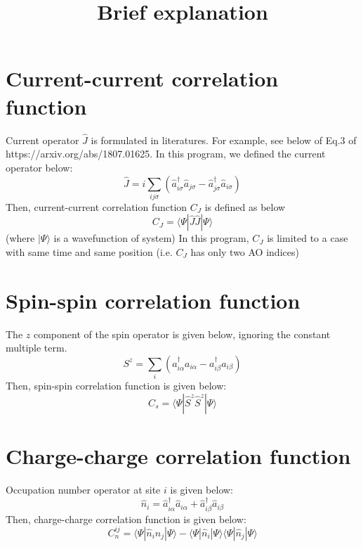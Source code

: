 \documentclass{article}
\begin{document}
\title{Brief explanation}
\maketitle


\section{Current-current correlation function}
Current operator $\hat{J}$ is formulated in literatures. 
For example, see below of Eq.3 of https://arxiv.org/abs/1807.01625.
In this program, we defined the current operator below:
\begin{equation}
    \hat{J} = i\sum_{ij\sigma} (\hat{a}^{\dagger}_{i\sigma}\hat{a}_{j\sigma} - \hat{a}^{\dagger}_{j\sigma}\hat{a}_{i\sigma})
\end{equation}
Then, current-current correlation function $C_{J}$ is defined as below
\begin{equation}
C_{J} = \langle \Psi | \hat{J}\hat{J} | \Psi \rangle
\end{equation}
(where $|\Psi\rangle$ is a wavefunction of system)
In this program, $C_{J}$ is limited to a case with same time and same position (i.e. $C_{J}$ has only two AO indices)

\section{Spin-spin correlation function}
The $z$ component of the spin operator is given below, ignoring the constant multiple term.
\begin{equation}
    S^{z} = \sum_{i} (a^{\dagger}_{i\alpha}a_{i\alpha} - a^{\dagger}_{i\beta}a_{i\beta})
\end{equation}
Then, spin-spin correlation function is given below:
\begin{equation}
C_{s} = \langle \Psi | \hat{S}^{z}\hat{S}^{z} | \Psi \rangle
\end{equation}

\section{Charge-charge correlation function}
Occupation number operator at site $i$ is given below:
\begin{equation}
\hat{n}_{i} = \hat{a}^{\dagger}_{i\alpha}\hat{a}_{i\alpha} + \hat{a}^{\dagger}_{i\beta}\hat{a}_{i\beta}
\end{equation}
Then, charge-charge correlation function is given below:
\begin{equation}
C_{n}^{ij} = \langle \Psi | \hat{n}_{i}\hat{n}_{j} | \Psi \rangle
- \langle \Psi | \hat{n}_{i} | \Psi \rangle
\langle \Psi | \hat{n}_{j} | \Psi \rangle
\end{equation}
\end{document}

